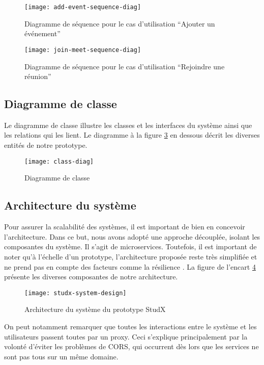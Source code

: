 \newpage

\begin{figure}[h]
  \centering
  \texttt{[image: add-event-sequence-diag]}
  \caption{Diagramme de séquence pour le cas d’utilisation “Ajouter un événement”}
  \label{fig:add_event_seq_diag}
\end{figure}

\begin{figure}[h]
  \centering
  \texttt{[image: join-meet-sequence-diag]}
  \caption{Diagramme de séquence pour le cas d’utilisation “Rejoindre une réunion”}
  \label{fig:join_meet_seq_diag}
\end{figure}

\subsection{Diagramme de classe}
Le diagramme de classe illustre les classes et les interfaces du système ainsi que les relations qui les lient. 
Le diagramme à la figure \ref{fig:class_diag} en dessous décrit les diverses entités de notre prototype.

\newpage
\begin{figure}[h]
  \centering
  \texttt{[image: class-diag]}
  \caption{Diagramme de classe}
  \label{fig:class_diag}
\end{figure}

\subsection{Architecture du système}
Pour assurer la scalabilité des systèmes, il est important de bien en concevoir l’architecture. 
Dans ce but, nous avons adopté une approche découplée, isolant les composantes du système. 
Il s’agit de microservices. Toutefois, il est important de noter qu'à l'échelle d’un prototype, 
l’architecture proposée reste très simplifiée et ne prend pas en compte des facteurs comme la résilience \cite{microservices_resiliency}. 
La figure de l'encart \ref{fig:system_design} présente les diverses composantes de notre architecture.


\begin{figure}[h]
  \centering
  \texttt{[image: studx-system-design]}
  \caption{Architecture du système du prototype StudX}
  \label{fig:system_design}
\end{figure}

On peut notamment remarquer que toutes les interactions entre le système et les utilisateurs passent toutes par un proxy. 
Ceci s’explique principalement par la volonté d'éviter les problèmes de CORS, 
qui occurrent dès lors que les services ne sont pas tous sur un même domaine.


